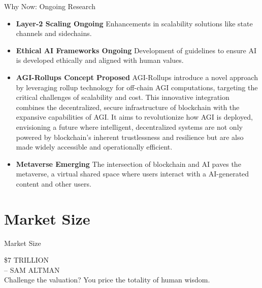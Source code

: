 \documentclass{beamer}
\begin{document}
\begin{frame}{Why Now: Ongoing Research}
\begin{itemize}
    \item \textbf{Layer-2 Scaling \textbar Ongoing \textbar} {\footnotesize Enhancements in scalability solutions like state channels and sidechains.}
    \item \textbf{Ethical AI Frameworks \textbar Ongoing \textbar} {\footnotesize Development of guidelines to ensure AI is developed ethically and aligned with human values.}
    \item \textbf{AGI-Rollups Concept \textbar Proposed \textbar} {\footnotesize AGI-Rollups introduce a novel approach by leveraging rollup technology for off-chain AGI computations, targeting the critical challenges of scalability and cost. This innovative integration combines the decentralized, secure infrastructure of blockchain with the expansive capabilities of AGI. It aims to revolutionize how AGI is deployed, envisioning a future where intelligent, decentralized systems are not only powered by blockchain's inherent trustlessness and resilience but are also made widely accessible and operationally efficient. }
    \item \textbf{Metaverse \textbar Emerging \textbar} {\footnotesize The  intersection of blockchain and AI paves the metaverse, a virtual shared space where users interact with a AI-generated content and other users. }
\end{itemize}
\end{frame}



\section{Market Size}
\begin{frame}{Market Size}
\begin{center}
    \Huge \$7 TRILLION \\
    \Large -- SAM ALTMAN \\
    \vspace{3em} %
    \normalsize{Challenge the valuation? You price the totality of human wisdom.}
\end{center}
\end{frame}
\end{document}

